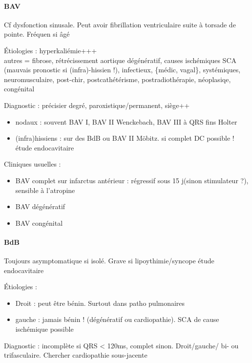 \documentclass{article}
\begin{document}
\paragraph{BAV}
Cf dysfonction sinusale. Peut avoir fibrillation ventriculaire suite à torsade
de pointe. Fréquen si âgé

Étiologies : hyperkaliémie+++ \\
autres = fibrose, rétrécissement aortique dégénératif, causes ischémiques
SCA (mauvais pronostic si (infra)-hissien !), infectieux, \{médic, vagal\},
systémiques, neuromusculaire, post-chir, postcathétérisme, postradiothérapie,
néoplasiqe, congénital

Diagnostic : précisier degré, paroxistique/permanent, siège++ 
\begin{itemize}
  \item nodaux : souvent BAV I, BAV II Wenckebach, BAV III à QRS fins \thus
    Holter
  \item (infra)hissiens : sur des BdB ou BAV II Möbitz. \skull si complet DC
    possible !\\
    \thus étude endocavitaire
\end{itemize}

Cliniques usuelles :
\begin{itemize}
  \item BAV complet sur infarctus antérieur : régressif sous 15 j(sinon stimulateur ?),
    sensible à l'atropine
  \item BAV dégénératif
  \item BAV congénital
\end{itemize}

\paragraph{BdB}
Toujours asymptomatique si isolé. Grave si lipoythimie/syncope \danger \thus
étude endocavitaire

Étiologies :
\begin{itemize}
  \item Droit : peut être bénin. Surtout dans patho pulmonaires
  \item gauche : jamais bénin ! (dégénératif ou cardiopathie). SCA de cause
    ischémique possible \skull
\end{itemize}

Diagnostic : incomplète si QRS < 120ms, complet sinon. Droit/gauche/ bi- ou
trifasculaire. Chercher cardiopathie sous-jacente
\end{document}
